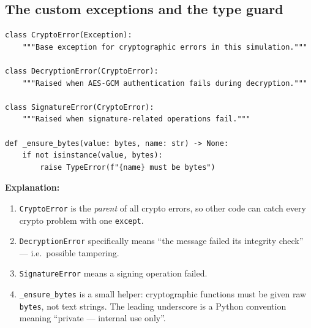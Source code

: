 \documentclass[11pt,a4paper]{report}
\begin{document}
\subsection{The custom exceptions and the type guard}
\begin{lstlisting}[style=py,caption={crypto.py --- custom exceptions and the bytes guard.}]
class CryptoError(Exception):
    """Base exception for cryptographic errors in this simulation."""

class DecryptionError(CryptoError):
    """Raised when AES-GCM authentication fails during decryption."""

class SignatureError(CryptoError):
    """Raised when signature-related operations fail."""

def _ensure_bytes(value: bytes, name: str) -> None:
    if not isinstance(value, bytes):
        raise TypeError(f"{name} must be bytes")
\end{lstlisting}
\textbf{Explanation:}
\begin{enumerate}
  \item \texttt{CryptoError} is the \emph{parent} of all crypto errors, so other
        code can catch every crypto problem with one \texttt{except}.
  \item \texttt{DecryptionError} specifically means ``the message failed its
        integrity check'' --- i.e.\ possible tampering.
  \item \texttt{SignatureError} means a signing operation failed.
  \item \texttt{\_ensure\_bytes} is a small helper: cryptographic functions must
        be given raw \texttt{bytes}, not text strings. The leading underscore is
        a Python convention meaning ``private --- internal use only''.
\end{enumerate}
\end{document}
